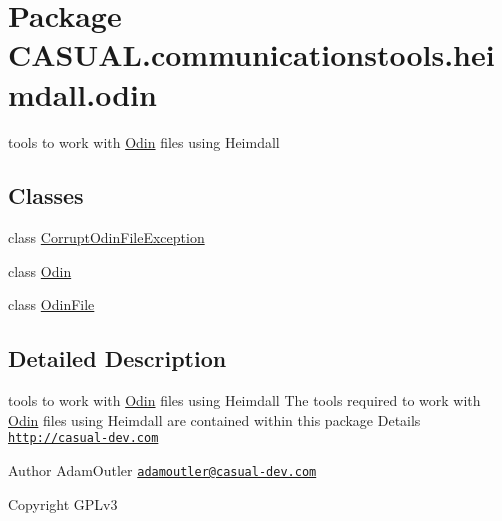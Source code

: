 \hypertarget{namespace_c_a_s_u_a_l_1_1communicationstools_1_1heimdall_1_1odin}{\section{Package C\-A\-S\-U\-A\-L.\-communicationstools.\-heimdall.\-odin}
\label{namespace_c_a_s_u_a_l_1_1communicationstools_1_1heimdall_1_1odin}
}


tools to work with \hyperlink{class_c_a_s_u_a_l_1_1communicationstools_1_1heimdall_1_1odin_1_1_odin}{Odin} files using Heimdall  


\subsection*{Classes}
\begin{DoxyCompactItemize}
\item 
class \hyperlink{class_c_a_s_u_a_l_1_1communicationstools_1_1heimdall_1_1odin_1_1_corrupt_odin_file_exception}{Corrupt\-Odin\-File\-Exception}
\item 
class \hyperlink{class_c_a_s_u_a_l_1_1communicationstools_1_1heimdall_1_1odin_1_1_odin}{Odin}
\item 
class \hyperlink{class_c_a_s_u_a_l_1_1communicationstools_1_1heimdall_1_1odin_1_1_odin_file}{Odin\-File}
\end{DoxyCompactItemize}


\subsection{Detailed Description}
tools to work with \hyperlink{class_c_a_s_u_a_l_1_1communicationstools_1_1heimdall_1_1odin_1_1_odin}{Odin} files using Heimdall The tools required to work with \hyperlink{class_c_a_s_u_a_l_1_1communicationstools_1_1heimdall_1_1odin_1_1_odin}{Odin} files using Heimdall are contained within this package Details \href{http://casual-dev.com}{\tt http\-://casual-\/dev.\-com} \begin{DoxyAuthor}{Author}
Adam\-Outler \href{mailto:adamoutler@casual-dev.com}{\tt adamoutler@casual-\/dev.\-com} 
\end{DoxyAuthor}
\begin{DoxyCopyright}{Copyright}
G\-P\-Lv3 
\end{DoxyCopyright}
